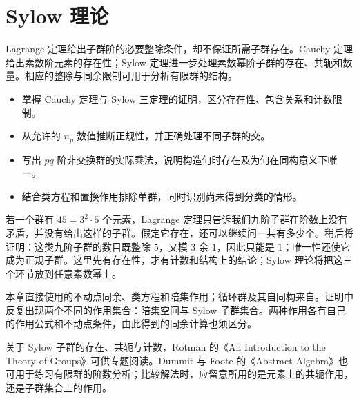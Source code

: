 
\chapter{Sylow 理论}
\label{b1:ch:05}

\begin{chapterabstract}
	Lagrange 定理给出子群阶的必要整除条件，却不保证所需子群存在。Cauchy 定理给出素数阶元素的存在性；Sylow 定理进一步处理素数幂阶子群的存在、共轭和数量。相应的整除与同余限制可用于分析有限群的结构。
\end{chapterabstract}

\begin{learninggoals}
	\begin{itemize}
		\item 掌握 Cauchy 定理与 Sylow 三定理的证明，区分存在性、包含关系和计数限制。
		\item 从允许的 \(n_p\) 数值推断正规性，并正确处理不同子群的交。
		\item 写出 \(pq\) 阶非交换群的实际乘法，说明构造何时存在及为何在同构意义下唯一。
		\item 结合类方程和置换作用排除单群，同时识别尚未得到分类的情形。
	\end{itemize}
\end{learninggoals}

若一个群有 \(45=3^2\cdot5\) 个元素，Lagrange 定理只告诉我们九阶子群在阶数上没有矛盾，并没有给出这样的子群。假定它存在，还可以继续问一共有多少个。稍后将证明：这类九阶子群的数目既整除 \(5\)，又模 \(3\) 余 \(1\)，因此只能是 \(1\)；唯一性还使它成为正规子群。这里先有存在性，才有计数和结构上的结论；Sylow 理论将把这三个环节放到任意素数幂上。

\ProseParagraphBreak

本章直接使用的不动点同余、类方程和陪集作用；循环群及其自同构来自。证明中反复出现两个不同的作用集合：陪集空间与 Sylow 子群集合。两种作用各有自己的作用公式和不动点条件，由此得到的同余计算也须区分。

\ProseParagraphBreak
关于 Sylow 子群的存在、共轭与计数，Rotman 的《An Introduction to the Theory of Groups》\cite[Chapter 4]{Rotman1995TheoryGroups}可供专题阅读。Dummit 与 Foote 的《Abstract Algebra》\cite[Sections 4.5, 5.3, 6.2]{DummitFoote2003}也可用于练习有限群的阶数分析；比较解法时，应留意所用的是元素上的共轭作用，还是子群集合上的作用。







